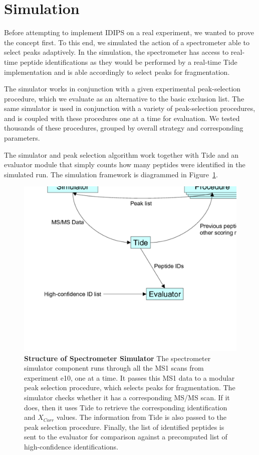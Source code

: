 \documentclass[12pt,twoside,openright]{report}
\newcommand{\XCorr}{\ensuremath{X_{Corr}}\xspace}
\begin{document}
\section{Simulation} %

Before attempting to implement IDIPS on a real experiment, we
wanted to prove the concept first. To this end, we simulated the action of a
spectrometer able to select peaks adaptively. In the simulation, the
spectrometer has access to real-time peptide identifications as they would be
performed by a real-time Tide implementation and is able accordingly to select
peaks for fragmentation.

The simulator works in conjunction with a given experimental peak-selection
procedure, which we evaluate as an alternative to the basic exclusion list. The
same simulator is used in conjunction with a variety of peak-selection
procedures, and is coupled with these procedures one at a time for
evaluation. We tested thousands of these procedures, grouped by overall strategy
and corresponding parameters.

The simulator and peak selection algorithm work together with Tide and an
evaluator module that simply counts how many peptides were identified in the
simulated run. The simulation framework is diagrammed in
Figure~\ref{figure:simulator}.

\begin{figure}
\centering
\includegraphics[width=6.0in]{SimulationFlow.pdf}
\caption[Structure of Spectrometer Simulator] {{\bf Structure of Spectrometer
    Simulator} The spectrometer simulator component runs through all the MS1
  scans from experiment e10, one at a time. It passes this MS1 data to a modular
  peak selection procedure, which selects peaks for fragmentation. The simulator
  checks whether it has a corresponding MS/MS scan. If it does, then it uses
  Tide to retrieve the corresponding identification and $\XCorr$ values. The
  information from Tide is also passed to the peak selection procedure. Finally,
  the list of identified peptides is sent to the evaluator for comparison
  against a precomputed list of high-confidence identifications.
  \label{figure:simulator}}
\end{figure}
\end{document}
